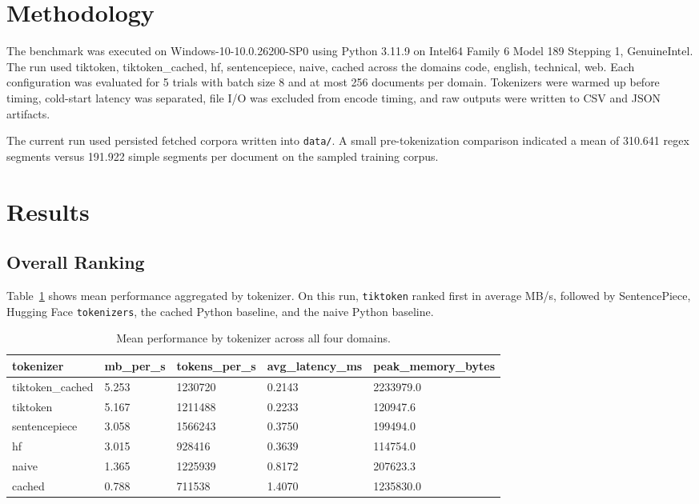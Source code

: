 \documentclass[11pt]{article}
\begin{document}
\section{Methodology}
The benchmark was executed on Windows-10-10.0.26200-SP0 using Python 3.11.9 on Intel64 Family 6 Model 189 Stepping 1, GenuineIntel. The run used tiktoken, tiktoken\_cached, hf, sentencepiece, naive, cached across the domains code, english, technical, web. Each configuration was evaluated for 5 trials with batch size 8 and at most 256 documents per domain. Tokenizers were warmed up before timing, cold-start latency was separated, file I/O was excluded from encode timing, and raw outputs were written to CSV and JSON artifacts.

The current run used persisted fetched corpora written into \texttt{data/}. A small pre-tokenization comparison indicated a mean of 310.641 regex segments versus 191.922 simple segments per document on the sampled training corpus.

\section{Results}

\subsection{Overall Ranking}
Table~\ref{tab:overall} shows mean performance aggregated by tokenizer. On this run, \texttt{tiktoken} ranked first in average MB/s, followed by SentencePiece, Hugging Face \texttt{tokenizers}, the cached Python baseline, and the naive Python baseline.

\begin{table}[H]
\centering
\begin{tabular}{lllll}
\toprule
tokenizer & mb\_per\_s & tokens\_per\_s & avg\_latency\_ms & peak\_memory\_bytes \\
\midrule
tiktoken\_cached & 5.253 & 1230720 & 0.2143 & 2233979.0 \\
tiktoken & 5.167 & 1211488 & 0.2233 & 120947.6 \\
sentencepiece & 3.058 & 1566243 & 0.3750 & 199494.0 \\
hf & 3.015 & 928416 & 0.3639 & 114754.0 \\
naive & 1.365 & 1225939 & 0.8172 & 207623.3 \\
cached & 0.788 & 711538 & 1.4070 & 1235830.0 \\
\bottomrule
\end{tabular}
\caption{Mean performance by tokenizer across all four domains.}
\label{tab:overall}
\end{table}
\end{document}
